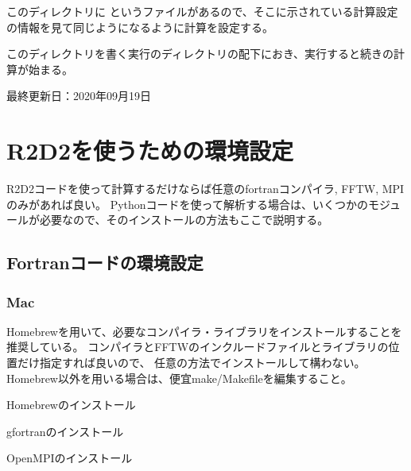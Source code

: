 \documentclass[letterpaper,10pt,dvipdfmx,report]{sphinxmanual}
\begin{document}
このディレクトリに  というファイルがあるので、そこに示されている計算設定の情報を見て同じようになるように計算を設定する。

このディレクトリを書く実行のディレクトリの配下におき、実行すると続きの計算が始まる。

最終更新日：2020年09月19日


\chapter{R2D2を使うための環境設定}
\label{\detokenize{environment:r2d2}}\label{\detokenize{environment::doc}}
R2D2コードを使って計算するだけならば任意のfortranコンパイラ, FFTW, MPIのみがあれば良い。
Pythonコードを使って解析する場合は、いくつかのモジュールが必要なので、そのインストールの方法もここで説明する。


\section{Fortranコードの環境設定}
\label{\detokenize{environment:fortran}}

\subsection{Mac}
\label{\detokenize{environment:mac}}
Homebrewを用いて、必要なコンパイラ・ライブラリをインストールすることを推奨している。
コンパイラとFFTWのインクルードファイルとライブラリの位置だけ指定すれば良いので、
任意の方法でインストールして構わない。Homebrew以外を用いる場合は、便宜make/Makefileを編集すること。

Homebrewのインストール

\begin{sphinxVerbatim}[commandchars=\\\{\}]
  
\end{sphinxVerbatim}

gfortranのインストール

\begin{sphinxVerbatim}[commandchars=\\\{\}]
  
\end{sphinxVerbatim}

OpenMPIのインストール
\end{document}

